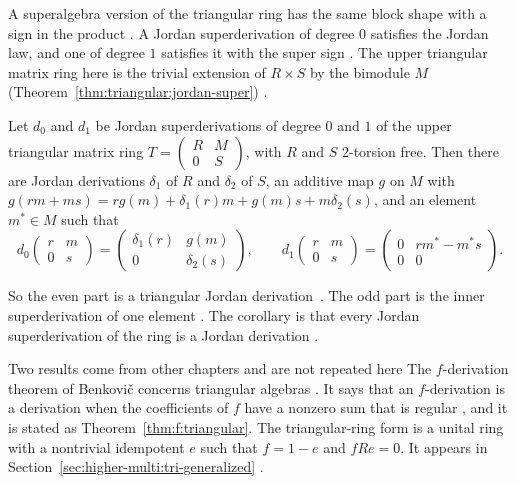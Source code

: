 A superalgebra version of the triangular ring has the same block shape with a
sign in the product \cite[p.~1]{CheraghpourJafari2024}. A Jordan superderivation
of degree $0$ satisfies the Jordan law, and one of degree $1$ satisfies it with
the super sign \cite[p.~2]{CheraghpourJafari2024}. The upper triangular matrix
ring here is the trivial extension of $R\times S$ by the bimodule $M$ (Theorem~\ref{thm:triangular:jordan-super})
\cite[p.~3]{CheraghpourJafari2024}.\begin{theorem}\label{thm:triangular:jordan-super}
Let $d_0$ and $d_1$ be Jordan superderivations of degree $0$ and $1$ of the
upper triangular matrix ring $T=\begin{pmatrix}R&M\\0&S\end{pmatrix}$, with $R$
and $S$ $2$-torsion free. Then there are Jordan derivations $\delta_1$ of $R$
and $\delta_2$ of $S$, an additive map $g$ on $M$ with
$g(rm+ms)=rg(m)+\delta_1(r)m+g(m)s+m\delta_2(s)$, and an element $m^{*}\in M$
such that
\[
d_0\begin{pmatrix}r&m\\0&s\end{pmatrix}
=\begin{pmatrix}\delta_1(r)&g(m)\\0&\delta_2(s)\end{pmatrix},
\qquad
d_1\begin{pmatrix}r&m\\0&s\end{pmatrix}
=\begin{pmatrix}0&rm^{*}-m^{*}s\\0&0\end{pmatrix}.
\]
\end{theorem}

So the even part is a triangular Jordan derivation~\cite[p.~6]{CheraghpourJafari2024}. The odd part is the inner
superderivation of one element \cite[p.~6]{CheraghpourJafari2024}. The
corollary is that every Jordan superderivation of the ring is a Jordan
derivation \cite[p.~6]{CheraghpourJafari2024}.

Two results come from other chapters and are not repeated here
The $f$-derivation theorem of Benkovič concerns triangular algebras
\cite[Theorem~1.1]{Benkovic2014}. It says that
an $f$-derivation is a derivation when the coefficients of $f$ have a nonzero
sum that is regular \cite[Theorem~1.1]{Benkovic2014}, and it is stated as
Theorem~\ref{thm:f:triangular}. The triangular-ring form is a unital ring with
a nontrivial idempotent $e$ such that $f=1-e$ and $fRe=0$. It appears in
Section~\ref{sec:higher-multi:tri-generalized}
\cite[p.~1953]{Wang2016Bideriv}.

